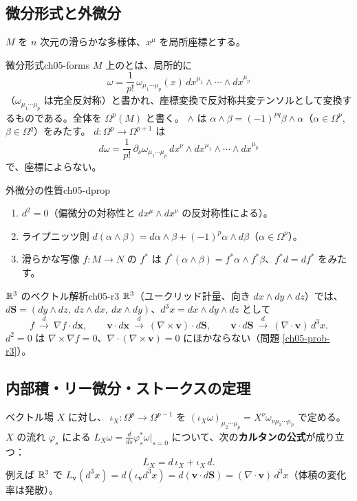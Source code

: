 \subsection{微分形式と外微分}
$M$ を $n$ 次元の滑らかな多様体、$x^\mu$ を局所座標とする。

\begin{mydef}{微分形式}{ch05-forms}
$M$ 上のとは、局所的に
\[
\omega=\frac1{p!}\,\omega_{\mu_1\cdots\mu_p}(x)\,dx^{\mu_1}\wedge\cdots\wedge dx^{\mu_p}
\]
（$\omega_{\mu_1\cdots\mu_p}$ は完全反対称）と書かれ、座標変換で反対称共変テンソルとして変換するものである。全体を $\Omega^p(M)$ と書く。 $\wedge$ は $\alpha\wedge\beta=(-1)^{pq}\beta\wedge\alpha$（$\alpha\in\Omega^p$, $\beta\in\Omega^q$）をみたす。 $d\colon\Omega^p\to\Omega^{p+1}$ は
\[
d\omega=\frac1{p!}\,\partial_\nu\omega_{\mu_1\cdots\mu_p}\,dx^\nu\wedge dx^{\mu_1}\wedge\cdots\wedge dx^{\mu_p}
\]
で、座標によらない。
\end{mydef}

\begin{myprop}{外微分の性質}{ch05-dprop}
\begin{enumerate}
\item $d^2=0$（偏微分の対称性と $dx^\mu\wedge dx^\nu$ の反対称性による）。
\item ライプニッツ則 $d(\alpha\wedge\beta)=d\alpha\wedge\beta+(-1)^p\alpha\wedge d\beta$（$\alpha\in\Omega^p$）。
\item 滑らかな写像 $f\colon M\to N$ の $f^*$ は $f^*(\alpha\wedge\beta)=f^*\alpha\wedge f^*\beta$、$f^*d=d f^*$ をみたす。
\end{enumerate}
\end{myprop}

\begin{myex}{$\mathbb{R}^3$ のベクトル解析}{ch05-r3}
$\mathbb{R}^3$（ユークリッド計量、向き $dx\wedge dy\wedge dz$）では、$d\bm S=(dy\wedge dz,\ dz\wedge dx,\ dx\wedge dy)$、$d^3x=dx\wedge dy\wedge dz$ として
\[
f\ \xrightarrow{\ d\ }\ \nabla f\cdot d\bm x,\qquad
\bm v\cdot d\bm x\ \xrightarrow{\ d\ }\ (\nabla\times\bm v)\cdot d\bm S,\qquad
\bm v\cdot d\bm S\ \xrightarrow{\ d\ }\ (\nabla\cdot\bm v)\,d^3x .
\]
$d^2=0$ は $\nabla\times\nabla f=0$、$\nabla\cdot(\nabla\times\bm v)=0$ にほかならない（問題 \ref{ch05-prob-r3}）。
\end{myex}

\subsection{内部積・リー微分・ストークスの定理}
ベクトル場 $X$ に対し、 $\iota_X\colon\Omega^p\to\Omega^{p-1}$ を $(\iota_X\omega)_{\mu_2\cdots\mu_p}=X^\nu\omega_{\nu\mu_2\cdots\mu_p}$ で定める。$X$ の流れ $\varphi_s$ による $L_X\omega=\frac{d}{ds}\varphi_s^*\omega\big|_{s=0}$ について、次の\textbf{カルタンの公式}が成り立つ：
\[
L_X=d\,\iota_X+\iota_X\,d .
\]
例えば $\mathbb{R}^3$ で $L_{\bm v}(d^3x)=d(\iota_{\bm v}d^3x)=d(\bm v\cdot d\bm S)=(\nabla\cdot\bm v)\,d^3x$（体積の変化率は発散）。

